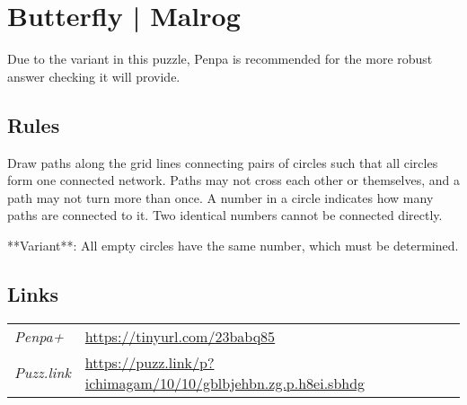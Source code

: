 \section[Butterfly | Malrog {[\emph{Magnetic Ichimaga}]}]{Butterfly | {\normalfont Malrog}}
\label{sec:22-butterfly-malrog}
Due to the variant in this puzzle, Penpa is recommended for the more robust answer checking it will provide.
\subsection*{Rules}
\begin{markdown}
Draw paths along the grid lines connecting pairs of circles such that all circles form one connected network. Paths may not cross each other or themselves, and a path may not turn more than once. A number in a circle indicates how many paths are connected to it. Two identical numbers cannot be connected directly.

**Variant**: All empty circles have the same number, which must be determined.
\end{markdown}
\subsection*{Links}
\begin{tabularx}{\textwidth}{l X}
\emph{Penpa+} & \url{https://tinyurl.com/23babq85} \\
\emph{Puzz.link} & \url{https://puzz.link/p?ichimagam/10/10/gblbjehbn.zg.p.h8ei.sbhdg} \\
\end{tabularx}
\pagebreak
